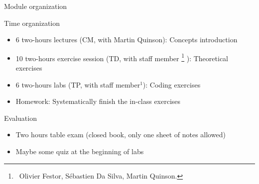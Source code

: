 \begin{frame}{Module organization}
  \begin{block}{Time organization}
    \begin{itemize}
    \item 6 two-hours lectures {\small(CM, with Martin Quinson)}: 
      Concepts introduction
    \item 10 two-hours exercise session {\small(TD, with staff member%
      \footnote{ ~Olivier Festor, Sébastien Da Silva, Martin Quinson.}%
      )}: Theoretical exercises
    \item 6 two-hours labs {\small(TP, with staff member$^1$)}: 
      Coding exercises
    \item Homework: Systematically finish the in-class exercises
    \end{itemize}
  \end{block}

  \begin{block}{Evaluation}
    \begin{itemize}
    \item Two hours table exam (closed book, only one sheet of notes allowed)
    \item Maybe some quiz at the beginning of labs
    \end{itemize}
  \end{block}
\end{frame}


